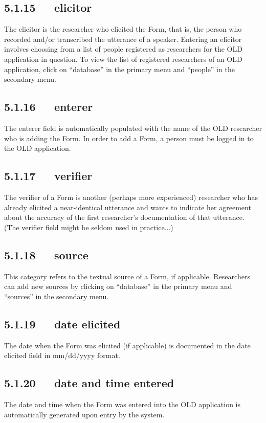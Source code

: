 \documentclass[letterpaper,10pt,english]{sphinxmanual}
\begin{document}
\subsection{5.1.15   elicitor}
\label{user_guide:elicitor}
The elicitor is the researcher who elicited the Form, that is, the person who
recorded and/or transcribed the utterance of a speaker.  Entering an elicitor
involves choosing from a list of people registered as researchers for the OLD
application in question.  To view the list of registered researchers of an OLD
application, click on ``database'' in the primary menu and ``people'' in the
secondary menu.


\subsection{5.1.16   enterer}
\label{user_guide:enterer}
The enterer field is automatically populated with the name of the OLD researcher
who is adding the Form.  In order to add a Form, a person must be logged in to
the OLD application.


\subsection{5.1.17   verifier}
\label{user_guide:verifier}
The verifier of a Form is another (perhaps more experienced) researcher who has
already elicited a near-identical utterance and wants to indicate her agreement
about the accuracy of the first researcher's documentation of that utterance.
(The verifier field might be seldom used in practice...)


\subsection{5.1.18   source}
\label{user_guide:source}
This category refers to the textual source of a Form, if applicable.
Researchers can add new sources by clicking on ``database'' in the primary menu
and ``sources'' in the secondary menu.


\subsection{5.1.19   date elicited}
\label{user_guide:date-elicited}
The date when the Form was elicited (if applicable) is documented in the date
elicited field in mm/dd/yyyy format.


\subsection{5.1.20   date and time entered}
\label{user_guide:date-and-time-entered}
The date and time when the Form was entered into the OLD application is
automatically generated upon entry by the system.
\end{document}
